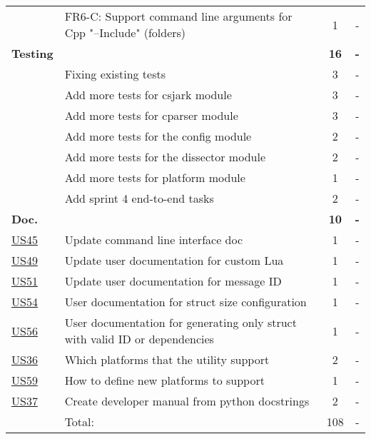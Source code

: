 \begin{table}[!htb]
\begin{tabularx}{\textwidth}{l X c c}
	 & FR6-C: Support command line arguments for Cpp "--Include" (folders) & 1 & - \\
	\addlinespace
	\textbf{Testing} &  & \textbf{16} & \textbf{-} \\
	 & Fixing existing tests & 3 & - \\
	 & Add more tests for csjark module & 3 & - \\
	 & Add more tests for cparser module & 3 & - \\
	 & Add more tests for the config module & 2 & - \\
	 & Add more tests for the dissector module & 2 & - \\
	 & Add more tests for platform module & 1 & - \\
	 & Add sprint 4 end-to-end tasks & 2 & - \\
	\addlinespace
	\textbf{Doc.} &  & \textbf{10} & \textbf{-} \\
	\hyperref[tab:req:stories10]{US45} & Update command line interface doc & 1 & - \\
	\hyperref[tab:req:stories11]{US49} & Update user documentation for custom Lua & 1 & - \\
	\hyperref[tab:req:stories12]{US51} & Update user documentation for message ID & 1 & - \\
	\hyperref[tab:req:stories12]{US54} & User documentation for struct size configuration & 1 & - \\
	\hyperref[tab:req:stories12]{US56} & User documentation for generating only struct with valid ID or dependencies & 1 & - \\
	\hyperref[tab:req:stories9]{US36} & Which platforms that the utility support & 2 & - \\
	\hyperref[tab:req:stories13]{US59} & How to define new platforms to support & 1 & - \\
	\hyperref[tab:req:stories9]{US37} & Create developer manual from python docstrings & 2 & - \\
	\midrule
	& Total: & 108 &  -\\
	\bottomrule
\end{tabularx}
\end{table}

